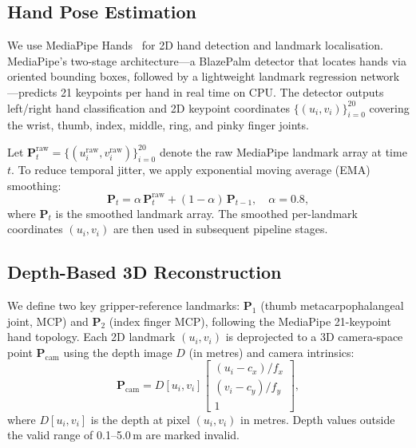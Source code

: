 \documentclass{ieeeaccess}
\newcommand{\vect}[1]{\mathbf{#1}}
\begin{document}
\subsection{Hand Pose Estimation}
\label{sec:handpose}

We use MediaPipe Hands~\cite{zhang2020mediapipe} for 2D hand detection
and landmark localisation. MediaPipe's two-stage architecture---a
BlazePalm detector that locates hands via oriented bounding boxes,
followed by a lightweight landmark regression network---predicts
21 keypoints per hand in real time on CPU. The detector outputs
left/right hand classification and 2D keypoint coordinates
$\{(u_i, v_i)\}_{i=0}^{20}$ covering the wrist, thumb, index, middle,
ring, and pinky finger joints.

Let $\vect{P}_t^{\text{raw}} = \{(u_i^{\text{raw}}, v_i^{\text{raw}})\}_{i=0}^{20}$
denote the raw MediaPipe landmark array at time $t$.
To reduce temporal jitter, we apply exponential moving average (EMA)
smoothing:
\begin{equation}\label{eq:ema}
  \vect{P}_{t} = \alpha\, \vect{P}_t^{\text{raw}}
                + (1 - \alpha)\, \vect{P}_{t-1},
  \quad \alpha = 0.8,
\end{equation}
where $\vect{P}_{t}$ is the smoothed landmark array.
The smoothed per-landmark coordinates $(u_i, v_i)$ are
then used in subsequent pipeline stages.

\subsection{Depth-Based 3D Reconstruction}
\label{sec:depth3d}

We define two key gripper-reference landmarks: $\vect{P}_1$ (thumb
metacarpophalangeal joint, MCP) and $\vect{P}_2$ (index finger MCP),
following the MediaPipe 21-keypoint hand topology.
Each 2D landmark $(u_i, v_i)$ is deprojected to a 3D camera-space point
$\vect{P}_{\text{cam}}$ using the depth image $D$ (in metres) and camera
intrinsics:
\begin{equation}\label{eq:deproject}
  \vect{P}_{\text{cam}}
  = D[u_i, v_i]
    \begin{bmatrix}
      (u_i - c_x) / f_x \\
      (v_i - c_y) / f_y \\
      1
    \end{bmatrix},
\end{equation}
where $D[u_i, v_i]$ is the depth at pixel $(u_i, v_i)$ in metres.
Depth values outside the valid range of 0.1--5.0\,m are marked invalid.
\end{document}
